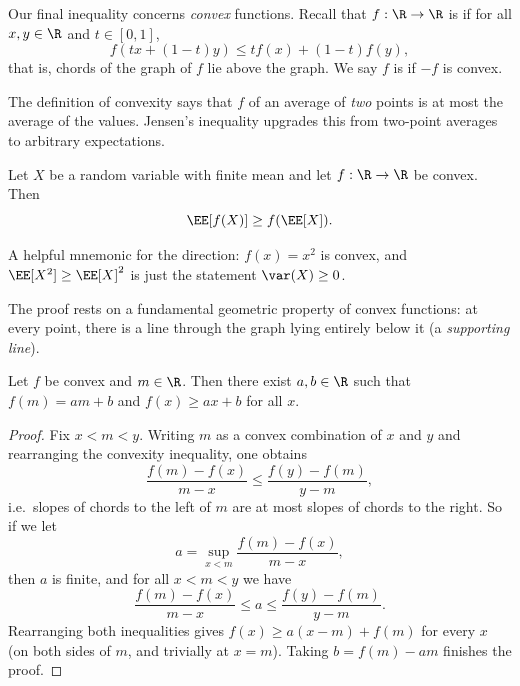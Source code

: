 Our final inequality concerns \emph{convex} functions. Recall that $f: \R \rightarrow \R$ is  if for all $x, y \in \R$ and $t \in [0, 1]$,
$$
f(tx + (1 - t)y) \leq tf(x) + (1 - t)f(y),
$$
that is, chords of the graph of $f$ lie above the graph. We say $f$ is  if $-f$ is convex.

\begin{center}
\end{center}

The definition of convexity says that $f$ of an average of \emph{two} points is at most the average of the values. Jensen's inequality upgrades this from two-point averages to arbitrary expectations.

\begin{theorem}
	Let $X$ be a random variable with finite mean and let $f: \R \rightarrow \R$ be convex. Then
	$$
	\EE[f(X)] \geq f(\EE[X]).
	$$
\end{theorem}

A helpful mnemonic for the direction: $f(x) = x^2$ is convex, and $\EE[X^2] \geq \EE[X]^2$ is just the statement $\var(X) \geq 0$.

The proof rests on a fundamental geometric property of convex functions: at every point, there is a line through the graph lying entirely below it (a \emph{supporting line}).

\begin{lemma}
	Let $f$ be convex and $m \in \R$. Then there exist $a, b \in \R$ such that $f(m) = am + b$ and $f(x) \geq ax + b$ for all $x$.
\end{lemma}
\begin{proof}
	Fix $x < m < y$. Writing $m$ as a convex combination of $x$ and $y$ and rearranging the convexity inequality, one obtains
	$$
	\frac{f(m) - f(x)}{m - x} \leq \frac{f(y) - f(m)}{y - m},
	$$
	i.e.\ slopes of chords to the left of $m$ are at most slopes of chords to the right. So if we let
	$$
	a = \sup_{x < m} \frac{f(m) - f(x)}{m - x},
	$$
	then $a$ is finite, and for all $x < m < y$ we have
	$$
	\frac{f(m) - f(x)}{m - x} \leq a \leq \frac{f(y) - f(m)}{y - m}.
	$$
	Rearranging both inequalities gives $f(x) \geq a(x - m) + f(m)$ for every $x$ (on both sides of $m$, and trivially at $x = m$). Taking $b = f(m) - am$ finishes the proof.
\end{proof}

